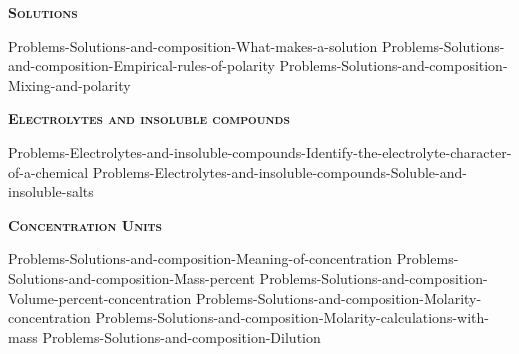 \documentclass[main.tex]{subfiles}
\begin{document}
\newpage\newcommand\chapterlabel{Ch-electrolytes}

\renewcommand{\bondwidth}{0.06642 em}  
\fancyhfoffset[E,O]{0pt}
\setlength{\columnsep}{30pt}
\begin{conclusion}
\iftoggle{chem121}{}{\setcounter{chapter}{5}}
\iftoggle{chem121}{\setcounter{chapter}{8}}{}
\end{conclusion}
\begin{multicols*}{2}\setcounter{numA}{1}  %

{\raggedright\textsc{\textbf{Solutions }}\par}
{Problems-Solutions-and-composition-What-makes-a-solution}
{Problems-Solutions-and-composition-Empirical-rules-of-polarity}
{Problems-Solutions-and-composition-Mixing-and-polarity}


{\raggedright\textsc{\textbf{Electrolytes and insoluble compounds}}\par}
\iftoggle{chem121}{}{
{Problems-Electrolytes-and-insoluble-compounds-Breaking-down-electrolytes-into-ions}%
}
{Problems-Electrolytes-and-insoluble-compounds-Identify-the-electrolyte-character-of-a-chemical}
{Problems-Electrolytes-and-insoluble-compounds-Soluble-and-insoluble-salts}


{\raggedright\textsc{\textbf{Concentration Units }}\par}
{Problems-Solutions-and-composition-Meaning-of-concentration}
{Problems-Solutions-and-composition-Mass-percent}
{Problems-Solutions-and-composition-Volume-percent-concentration}
{Problems-Solutions-and-composition-Molarity-concentration}
{Problems-Solutions-and-composition-Molarity-calculations-with-mass}
{Problems-Solutions-and-composition-Dilution}




\end{multicols*}
\end{document}
